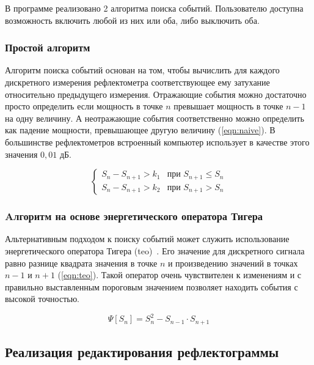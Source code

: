 В программе реализовано 2 алгоритма поиска событий. Пользователю доступна возможность включить любой из них или оба, либо выключить оба.

\subsubsection{Простой алгоритм} \label{простой_алгоритм}

Алгоритм поиска событий основан на том, чтобы вычислить для каждого дискретного измерения рефлектометра соответствующее ему затухание относительно предыдущего измерения. Отражающие события можно достаточно просто определить если мощность в точке $n$ превышает мощность в точке $n-1$ на одну величину. А неотражающие события соответственно можно определить как падение мощности, превышающее другую величину (\ref{eqn:naive}). В большинстве рефлектометров встроенный компьютер использует в качестве этого значения $0,01 \text{ дБ}$.

\begin{equation}
  \label{eqn:naive}
  \left\{
    \begin{array}{ll}
      S_n - S_{n+1} > k_1 & \text{при } S_{n+1} \leqslant S_n \\
      S_n - S_{n+1} > k_2 & \text{при } S_{n+1} > S_n
    \end{array}
  \right.
\end{equation}

\subsubsection{Aлгоритм на основе энергетического оператора Тигера} \label{тео_алгоритм}

Альтернативным подходом к поиску событий может служить использование энергетического оператора Тигера (\acrshort{teo})~\cite{lima:teo}. Его значение для дискретного сигнала равно разнице квадрата значения в точке $n$ и произведению значений в точках $n-1$ и $n+1$ (\ref{eqn:teo}). Такой оператор очень чувствителен к изменениям и с правильно выставленным пороговым значением позволяет находить события с высокой точностью.

\begin{equation}
  \label{eqn:teo}
  \Psi[S_n] = S_n^2-S_{n-1}\cdot S_{n+1}
\end{equation}

\subsection{Реализация редактирования рефлектограммы}

